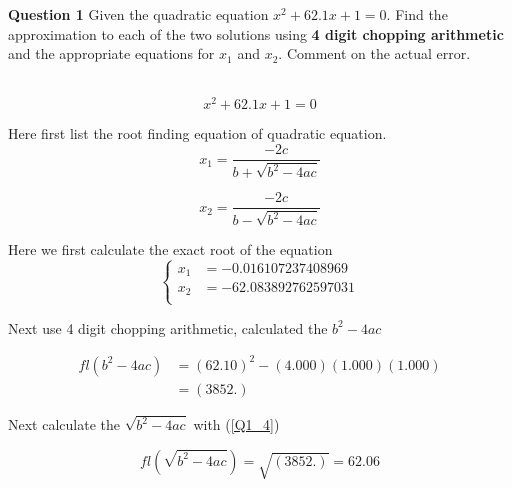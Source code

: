 

\begin{tcolorbox}
\textbf{Question 1} Given the quadratic equation $x^{2}+62.1 x+1=0$. Find the approximation to each of the two solutions using \textbf{4 digit chopping arithmetic} and the appropriate equations for $x_{1}$ and $x_{2}$. Comment on the actual error.
\end{tcolorbox}

\begin{solution}\ \\




\begin{equation}
	x^{2}+62.1 x+1=0 \label{question_1_origin}
\end{equation}





Here first list the root finding equation of quadratic equation.
\begin{equation}
x_{1}=\frac{-2 c}{b+\sqrt{b^{2}-4 a c}} \label{Q1_x1_root_finding_function}
\end{equation}

\begin{equation}
x_{2}=\frac{-2 c}{b-\sqrt{b^{2}-4 a c}} \label{Q1_x2_root_finding_function}
\end{equation}


Here we first calculate the exact root of the equation
\begin{equation}
\left\{
	\begin{aligned}
		x_1&=-0.016107237408969\\
		x_2&=-62.083892762597031  \\ 
	\end{aligned}
\right.\label{Q1_exact_root}
\end{equation}

Next use 4 digit chopping arithmetic, calculated the $b^2-4ac$

\begin{equation}
\begin{aligned}
f l\left(b^{2}-4 a c\right) &=(62.10)^{2}-(4.000)(1.000)(1.000) \\
&=(3852 .) \label{Q1_4}
\end{aligned}
\end{equation}



Next calculate the $\sqrt{b^2-4ac}$ with (\ref{Q1_4})

\begin{equation}
	fl(\sqrt{b^2-4ac})=\sqrt{(3852.)}=62.06 \label{3852}
\end{equation}


\end{solution}
